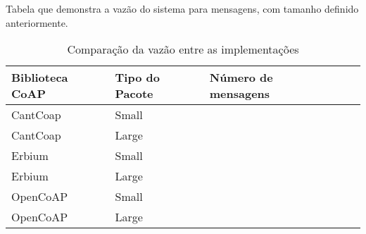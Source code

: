 Tabela que demonstra a vaz\~ao do sistema para mensagens, com tamanho definido anteriormente.

\begin{table}[h]
\label{throughputCoap}
\centering
\begin{tabular}{@{}lllll@{}}
\toprule
Biblioteca CoAP & Tipo do Pacote & N\'umero de mensagens &  \\ \midrule
CantCoap &  Small &  & \\
CantCoap &  Large &  & \\
Erbium &  Small &  &  \\
Erbium &  Large &  &  \\
OpenCoAP &  Small &  &  \\
OpenCoAP &  Large &  &  \\ \bottomrule
\end{tabular}
\caption{Compara\c{c}\~ao da vaz\~ao entre as  implementa\c{c}\~oes}
\end{table}
